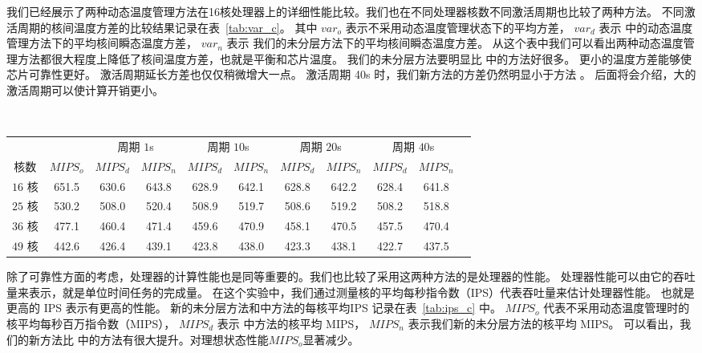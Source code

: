  我们已经展示了两种动态温度管理方法在16核处理器上的详细性能比较。我们也在不同处理器核数不同激活周期也比较了两种方法。
 不同激活周期的核间温度方差的比较结果记录在表~\ref{tab:var_c}。
 其中 $var_o$ 表示不采用动态温度管理状态下的平均方差，
 $var_d$ 表示 \cite{Zanini:ECCTD'09}中的动态温度管理方法下的平均核间瞬态温度方差，
 $var_n$ 表示 我们的未分层方法下的平均核间瞬态温度方差。
 从这个表中我们可以看出两种动态温度管理方法都很大程度上降低了核间温度方差，也就是平衡和芯片温度。
 我们的未分层方法要明显比 \cite{Zanini:ECCTD'09} 中的方法好很多。
 更小的温度方差能够使芯片可靠性更好。
 激活周期延长方差也仅仅稍微增大一点。
 激活周期 40s  时，我们新方法的方差仍然明显小于方法 \cite{Zanini:ECCTD'09}。
 后面将会介绍，大的激活周期可以使计算开销更小。
 
 
 
 
 \begin{table*}
\tabcolsep=1pt
\small
 \centering
 \caption{未分层方法与其他方法的IPS比较 }~\label{tab:ips_c} 
 \begin{tabular}{|c|c|c|c|c|c|c|c|c|c|c|}
 \hline
 \hline
                &         & \multicolumn{2}{c|}{周期 $1$s} & \multicolumn{2}{c|}{周期 $10$s}& \multicolumn{2}{c|}{周期 $20$s}& \multicolumn{2}{c|}{周期 $40$s}\\
 核数  &$MIPS_o$ & $MIPS_d$ & $MIPS_n$  & $MIPS_d$ & $MIPS_n$  & $MIPS_d$ & $MIPS_n$  & $MIPS_d$ & $MIPS_n$ \\
 \hline 
 \hline
 $16$ 核 & 651.5 & 630.6 & 643.8  & 628.9 & 642.1  & 628.8 & 642.2 & 628.4 & 641.8  \\
 \hline
 $25$ 核 & 530.2 & 508.0 & 520.4 & 508.9 & 519.7  & 508.6 & 519.2  & 508.2 & 518.8  \\
 \hline
 $36$ 核 & 477.1 & 460.4 & 471.4  & 459.6 & 470.9  & 458.1 & 470.5  & 457.5 & 470.4  \\
 \hline
 $49$ 核 & 442.6 & 426.4 & 439.1  & 423.8 & 438.0  & 423.3 & 438.1  & 422.7 & 437.5  \\
 \hline
 \hline
 \end{tabular}
 \end{table*}
 
 除了可靠性方面的考虑，处理器的计算性能也是同等重要的。我们也比较了采用这两种方法的是处理器的性能。
 处理器性能可以由它的吞吐量来表示，就是单位时间任务的完成量。
 在这个实验中，我们通过测量核的平均每秒指令数（IPS）代表吞吐量来估计处理器性能。
 也就是更高的 IPS 表示有更高的性能。
 新的未分层方法和\cite{Zanini:ECCTD'09}中方法的每核平均IPS 记录在表~\ref{tab:ips_c} 中。
 $MIPS_o$ 代表不采用动态温度管理时的核平均每秒百万指令数（MIPS），
 $MIPS_d$ 表示 \cite{Zanini:ECCTD'09}中方法的核平均 MIPS，
 $MIPS_n$ 表示我们新的未分层方法的核平均 MIPS。
 可以看出，我们的新方法比 \cite{Zanini:ECCTD'09} 中的方法有很大提升。对理想状态性能$MIPS_o$显著减少。
 
